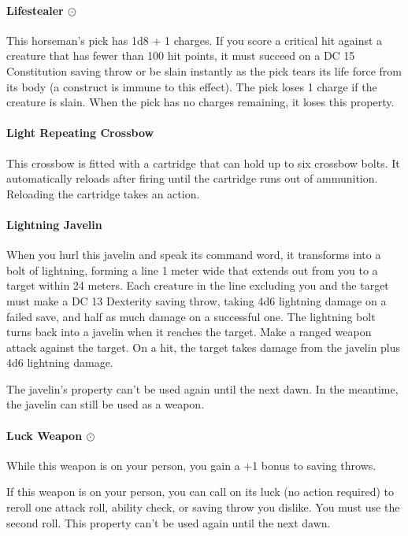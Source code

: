     \paragraph{Lifestealer $\odot$}
        This horseman's pick has 1d8 + 1 charges.
        If you score a critical hit against a creature that has fewer than 100 hit points, it must succeed on a DC 15 Constitution saving throw or be slain instantly as the pick tears its life force from its body (a construct is immune to this effect).
        The pick loses 1 charge if the creature is slain.
        When the pick has no charges remaining, it loses this property.
    \paragraph{Light Repeating Crossbow}
        This crossbow is fitted with a cartridge that can hold up to six crossbow bolts.
        It automatically reloads after firing until the cartridge runs out of ammunition.
        Reloading the cartridge takes an action.
    \paragraph{Lightning Javelin}
        When you hurl this javelin and speak its command word, it transforms into a bolt of lightning, forming a line 1 meter wide that extends out from you to a target within 24 meters.
        Each creature in the line excluding you and the target must make a DC 13 Dexterity saving throw, taking 4d6 lightning damage on a failed save, and half as much damage on a successful one.
        The lightning bolt turns back into a javelin when it reaches the target.
        Make a ranged weapon attack against the target.
        On a hit, the target takes damage from the javelin plus 4d6 lightning damage.

        The javelin's property can't be used again until the next dawn.
        In the meantime, the javelin can still be used as a weapon.
    \paragraph{Luck Weapon $\odot$}
        While this weapon is on your person, you gain a +1 bonus to saving throws.

        If this weapon is on your person, you can call on its luck (no action required) to reroll one attack roll, ability check, or saving throw you dislike.
        You must use the second roll.
        This property can't be used again until the next dawn.
